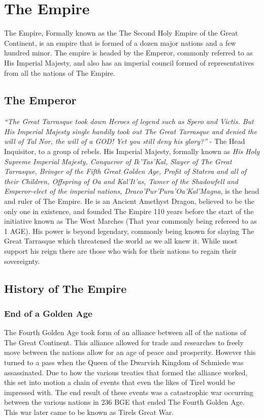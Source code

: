 \chapter{The Empire}
The Empire, Formally known as the The Second Holy Empire of the Great Continent, is an empire that is formed of a dozen major nations and a few hundred minor. The empire is headed by the Emperor, commonly referred to as His Imperial Majesty, and also has an imperial council formed of representatives from all the nations of The Empire.
\section{The Emperor}
\textit{“The Great Tarrasque took down Heroes of legend such as Spero and Victis. But His Imperial Majesty single handily took out The Great Tarrasque and denied the will of Tal Nor, the will of a GOD! Yet you still deny his glory?”}
\break
\hspace*{\fill} - The Head Inquisitor, to a group of rebels.
\break
\break
His Imperial Majesty, formally known as \textit{His Holy Supreme Imperial  Majesty, Conqueror of Ik’Tas’Kal, Slayer of The Great Tarrasque, Bringer of the Fifth Great Golden Age, Profit of Statera and all of their Children, Offspring of Oa and Kal'It'as, Tamer of the Shadowfell and Emperor-elect of the imperial nations, Draco’Pur’Pura’Oa’Kal’Magna}, is the head and ruler of The Empire.\newline
He is an Ancient Amethyst Dragon, believed to be the only one in existence, and founded The Empire 110 years before the start of the initiative known as The West Marches (That year commonly being refereed to as 1 AGE). His power is beyond legendary, commonly being known for slaying The Great Tarrasque which threatened the world as we all knew it. While most support his reign there are those who wish for their nations to regain their sovereignty. 
\section{History of The Empire}
\subsection{End of a Golden Age}
The Fourth Golden Age took form of an alliance between all of the nations of The Great Continent. This alliance allowed for trade and researches to freely move between the nations allow for an age of peace and prosperity.\newline
However this turned to a pass when the Queen of the Dwarvish Kingdom of Schmiede was assassinated. Due to how the various treaties that formed the alliance worked, this set into motion a chain of events that even the likes of Tirel would be impressed with. The end result of these events was a catastrophic war occurring between the various nations in 236 BGE that ended The Fourth Golden Age. This war later came to be known as Tirels Great War.
